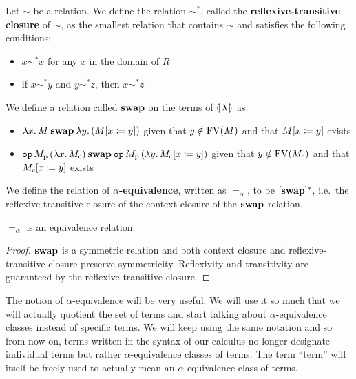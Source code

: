\begin{definition}
  Let $\sim$ be a relation. We define the relation $\sim^*$, called the
  \textbf{reflexive-transitive closure} of $\sim$, as the smallest relation
  that contains $\sim$ and satisfies the following conditions:

  \begin{itemize}
  \item $x \sim^* x$ for any $x$ in the domain of $R$
  \item if $x \sim^* y$ and $y \sim^* z$, then $x \sim^* z$
  \end{itemize}
\end{definition}

\begin{definition}
  We define a relation called $\mathbin{\textbf{swap}}$ on the terms of ${\llparenthesis \, \lambda \, \rrparenthesis}$ as:

  \begin{itemize}
  \item $\lambda x.\, M \mathbin{\textbf{swap}} \lambda y.\, (M[x \coloneqq y])$ given that $y \notin
    \operatorname{FV}(M)$ and that $M[x \coloneqq y]$ exists
  \item
    $\mathtt{op}\,M_{\mathrm{p}}\,(\lambda x.\, M_{\mathrm{c}}) \mathbin{\textbf{swap}}
    \mathtt{op}\,M_{\mathrm{p}}\,(\lambda y.\, M_{\mathrm{c}}[x \coloneqq y])$ given
    that $y \notin \operatorname{FV}(M_{\mathrm{c}})$ and that $M_{\mathrm{c}}[x \coloneqq y]$
    exists
  \end{itemize}
\end{definition}

\begin{definition}
  We define the relation of \textbf{$\alpha$-equivalence}, written as
  $=_\alpha$, to be $[\mathbin{\textbf{swap}}]^*$, i.e.\ the reflexive-transitive closure of
  the context closure of the $\mathbin{\textbf{swap}}$ relation.
\end{definition}

\begin{observation}
  $=_\alpha$ is an equivalence relation.
\end{observation}
\begin{proof}
  $\mathbin{\textbf{swap}}$ is a symmetric relation and both context closure and
  reflexive-transitive closure preserve symmetricity. Reflexivity and
  transitivity are guaranteed by the reflexive-transitive closure.
\end{proof}

The notion of $\alpha$-equivalence will be very useful. We will use it so
much that we will actually quotient the set of terms and start talking
about $\alpha$-equivalence classes instead of specific terms. We will keep
using the same notation and so from now on, terms written in the syntax of
our calculus no longer designate individual terms but rather
$\alpha$-equivalence classes of terms. The term ``term'' will itself be
freely used to actually mean an $\alpha$-equivalence class of terms.

